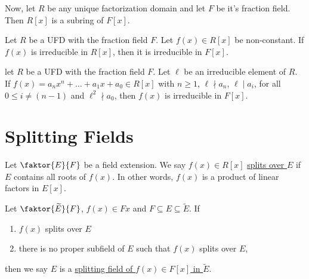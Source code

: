 \documentclass[11pt]{article}
\newcommand{\quotient}[2]{\faktor{#1}{#2}}
\begin{document}
\sectionline
Now, let $R$ be any unique factorization domain and let $F$ be it's fraction
field. Then $R[x]$ is a subring of $F[x]$.
\begin{lemma*} 
Let $R$ be a UFD with the fraction field $F$. Let $f(x) \in R[x]$ be
non-constant. If $f(x)$ is irreducible in $R[x]$, then it is irreducible in
$F[x]$.
\end{lemma*}
\begin{theorem} 
let $R$ be a UFD with the fraction field $F$. Let $\ell$ be an irreducible
element of $R$. If $f(x) = a_nx^n + \dots + a_1x + a_0 \in R[x]$ with $n \geq
1$, $\ell \nmid a_n$, $\ell \mid a_i$, for all $0 \leq i \neq (n-1)$ and
$\ell^2 \nmid a_0$, then $f(x)$ is irreducible in $F[x]$.
\end{theorem}

\pagebreak
\section{Splitting Fields}
\begin{definition}
Let $\quotient{E}{F}$ be a field extension. We say $f(x) \in R[x]$
\underline{splits over $E$} if $E$ contains all roots of $f(x)$. In other words,
$f(x)$ is a product of linear factors in $E[x]$.
\end{definition}
\begin{definition}
Let $\quotient{\tilde{E}}{F}$, $f(x) \in F{x}$ and $F \subseteq E \subseteq
\tilde E$. If
\begin{enumerate}
\item $f(x)$ splits over $E$
\item there is no proper subfield of $E$ such that $f(x)$ splits over $E$, 
\end{enumerate}
then
we say $E$ is a \underline{splitting field of $f(x) \in F[x]$ in $\tilde E$}.
\end{definition}
\end{document}
